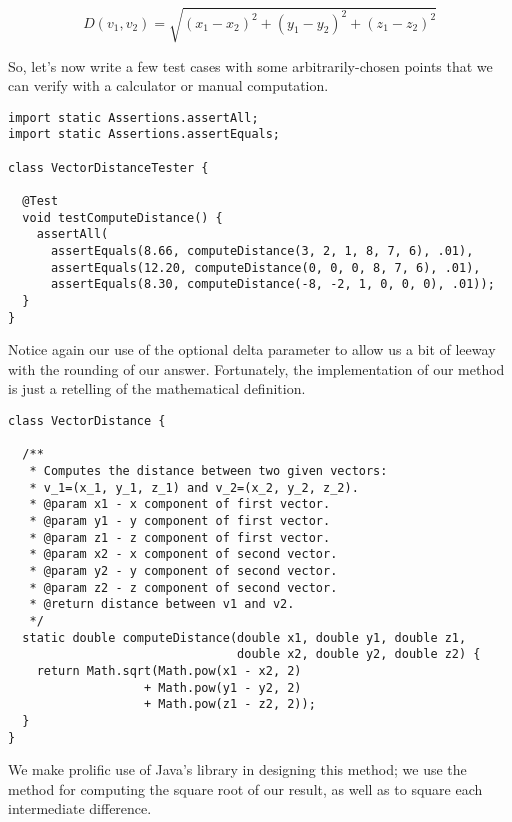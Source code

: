 \[
D(v_1, v_2) = \sqrt{(x_1 - x_2)^2 + (y_1 - y_2)^2 + (z_1 - z_2)^2}
\]

So, let's now write a few test cases with some arbitrarily-chosen points that we can verify with a calculator or manual computation.

\begin{lstlisting}[language=MyJava]
import static Assertions.assertAll;
import static Assertions.assertEquals;

class VectorDistanceTester {

  @Test
  void testComputeDistance() {
    assertAll(
      assertEquals(8.66, computeDistance(3, 2, 1, 8, 7, 6), .01),
      assertEquals(12.20, computeDistance(0, 0, 0, 8, 7, 6), .01),
      assertEquals(8.30, computeDistance(-8, -2, 1, 0, 0, 0), .01));
  }
}
\end{lstlisting}

Notice again our use of the optional delta parameter to allow us a bit of leeway with the rounding of our answer. 
Fortunately, the implementation of our method is just a retelling of the mathematical definition.

\enlargethispage{-2\baselineskip}
\begin{lstlisting}[language=MyJava]
class VectorDistance {

  /**
   * Computes the distance between two given vectors:
   * v_1=(x_1, y_1, z_1) and v_2=(x_2, y_2, z_2).
   * @param x1 - x component of first vector.
   * @param y1 - y component of first vector.
   * @param z1 - z component of first vector.
   * @param x2 - x component of second vector.
   * @param y2 - y component of second vector.
   * @param z2 - z component of second vector.
   * @return distance between v1 and v2.
   */
  static double computeDistance(double x1, double y1, double z1, 
                                double x2, double y2, double z2) {
    return Math.sqrt(Math.pow(x1 - x2, 2) 
                   + Math.pow(y1 - y2, 2)
                   + Math.pow(z1 - z2, 2));
  }
}
\end{lstlisting}

We make prolific use of Java's  library in designing this method; we use the  method for computing the square root of our result, as well as  to square each intermediate difference.

